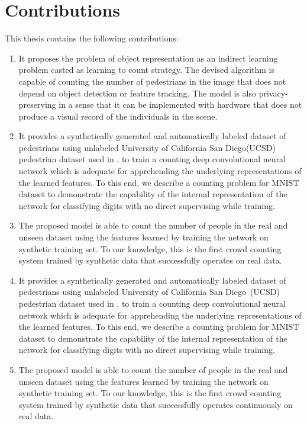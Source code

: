 \section{Contributions}
This thesis contains the following contributions:
\begin{enumerate}
	\item It proposes the problem of object representation as an indirect learning problem casted as learning to count strategy. The devised algorithm is capable of counting the number of pedestrians in the image that does not depend on object detection or feature tracking. The model is also privacy-preserving in a sense that it can be implemented with hardware that does not produce a visual record of the individuals in the scene. 

	\item It provides a synthetically generated and automatically labeled dataset of pedestrians using unlabeled University of California San Diego(UCSD) pedestrian dataset used in \cite{mahadevan2010anomaly}, to train a counting deep convolutional neural network which is adequate for apprehending the underlying representations of the learned features. To this end, we describe a counting problem for MNIST  dataset to demonstrate the capability of the internal representation of the network for classifying digits with no direct supervising while training. 
	\item The proposed model is able to count the number of people in the real and unseen dataset using the features learned by training the network on synthetic training set. To our knowledge, this is the first crowd counting system trained by synthetic data that successfully operates on real data. 

	\item It provides a synthetically generated and automatically labeled dataset of pedestrians using unlabeled University of California San Diego~(UCSD) pedestrian dataset used in \cite{mahadevan2010anomaly}, to train a counting deep convolutional neural network which is adequate for apprehending the underlying representations of the learned features. To this end, we describe a counting problem for MNIST dataset to demonstrate the capability of the internal representation of the network for classifying digits with no direct supervising while training. 
	\item The proposed model is able to count the number of people in the real and unseen dataset using the features learned by training the network on synthetic training set. To our knowledge, this is the first crowd counting system trained by synthetic data that successfully operates continuously on real data. 


\end{enumerate}
